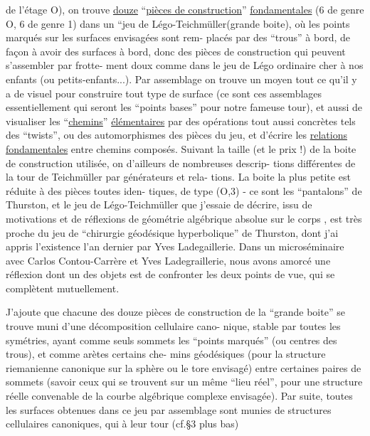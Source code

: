
de l'étage O), on trouve \uline{douze} ``\uline{pièces de construction}'' \uline{fondamentales}
(6 de genre O, 6 de genre 1) dans un ``jeu de Légo-Teichmüller\hand{\unsure{*}}(grande \margin{\unsure{*}}
boite), où les points marqués sur les surfaces envisagées sont rem-%
placés par des ``trous'' à bord, de façon à avoir des surfaces à bord,
donc des pièces de construction qui peuvent s'assembler par frotte-%
ment doux comme dans le jeu de Légo ordinaire cher à nos enfants
(ou petits-enfants...). Par assemblage on trouve un moyen tout ce
qu'il y a de visuel pour construire tout type de surface (ce sont
ces assemblages essentiellement qui seront les ``points bases'' pour
notre fameuse tour), et aussi de visualiser les ``\uline{chemins}'' \uline{élémentaires}
par des opérations tout aussi concrètes tels des ``twists'', ou des
automorphismes des pièces du jeu, et d'écrire les \uline{relations fondamentales}
entre chemins composés. Suivant la taille (et le prix !) de la boite
de construction utilisée, on  d'ailleurs de nombreuses descrip-%
tions différentes de la tour de Teichmüller par générateurs et rela-%
tions. La boite la plus petite est réduite à des pièces toutes iden-%
tiques, de type (O,3) - ce sont les ``pantalons'' de Thurston, et le
jeu de Légo-Teichmüller que j'essaie de décrire, issu de motivations
et de réflexions de géométrie algébrique absolue sur le corps ,
est très proche du jeu de ``chirurgie géodésique hyperbolique'' de
Thurston, dont j'ai appris l'existence l'an dernier par Yves Ladegaillerie.
Dans un microséminaire avec Carlos Contou-Carrère et Yves Ladegraillerie,
nous avons amorcé une réflexion dont un des objets est de confronter
les deux points de vue, qui se complètent mutuellement.

J'ajoute que chacune des douze pièces de construction de
la ``grande boite'' se trouve muni d'une décomposition cellulaire cano-%
nique, stable par toutes les symétries, ayant comme seuls sommets les
``points marqués'' (ou centres des trous), et comme arètes certains che-%
mins géodésiques (pour la structure riemanienne canonique sur la sphère
ou le tore envisagé) entre certaines paires de sommets (savoir ceux
qui se trouvent sur un même ``lieu réel'', pour une structure réelle
convenable de la courbe algébrique complexe envisagée). Par suite,
toutes les surfaces obtenues dans ce jeu par assemblage sont munies
de structures cellulaires canoniques, qui à leur tour (cf.§3 plus bas)

